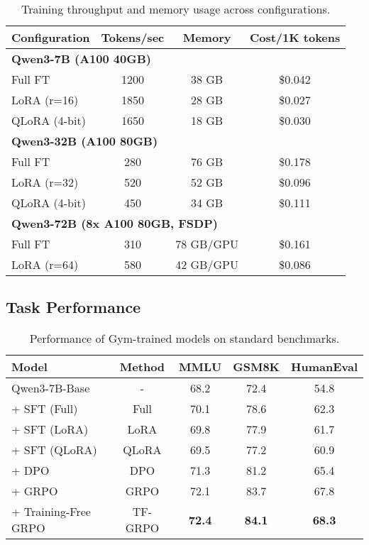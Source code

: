 \documentclass[11pt,letterpaper]{article}
\begin{document}
\begin{table}[h]
\centering
\begin{tabular}{lccc}
\toprule
Configuration & Tokens/sec & Memory & Cost/1K tokens \\
\midrule
\multicolumn{4}{l}{\textbf{Qwen3-7B (A100 40GB)}} \\
Full FT & 1200 & 38 GB & \$0.042 \\
LoRA (r=16) & 1850 & 28 GB & \$0.027 \\
QLoRA (4-bit) & 1650 & 18 GB & \$0.030 \\
\midrule
\multicolumn{4}{l}{\textbf{Qwen3-32B (A100 80GB)}} \\
Full FT & 280 & 76 GB & \$0.178 \\
LoRA (r=32) & 520 & 52 GB & \$0.096 \\
QLoRA (4-bit) & 450 & 34 GB & \$0.111 \\
\midrule
\multicolumn{4}{l}{\textbf{Qwen3-72B (8x A100 80GB, FSDP)}} \\
Full FT & 310 & 78 GB/GPU & \$0.161 \\
LoRA (r=64) & 580 & 42 GB/GPU & \$0.086 \\
\bottomrule
\end{tabular}
\caption{Training throughput and memory usage across configurations.}
\end{table}

\subsection{Task Performance}

\begin{table}[h]
\centering
\begin{tabular}{lcccc}
\toprule
Model & Method & MMLU & GSM8K & HumanEval \\
\midrule
Qwen3-7B-Base & - & 68.2 & 72.4 & 54.8 \\
+ SFT (Full) & Full & 70.1 & 78.6 & 62.3 \\
+ SFT (LoRA) & LoRA & 69.8 & 77.9 & 61.7 \\
+ SFT (QLoRA) & QLoRA & 69.5 & 77.2 & 60.9 \\
\midrule
+ DPO & DPO & 71.3 & 81.2 & 65.4 \\
+ GRPO & GRPO & 72.1 & 83.7 & 67.8 \\
+ Training-Free GRPO & TF-GRPO & \textbf{72.4} & \textbf{84.1} & \textbf{68.3} \\
\bottomrule
\end{tabular}
\caption{Performance of Gym-trained models on standard benchmarks.}
\end{table}
\end{document}
